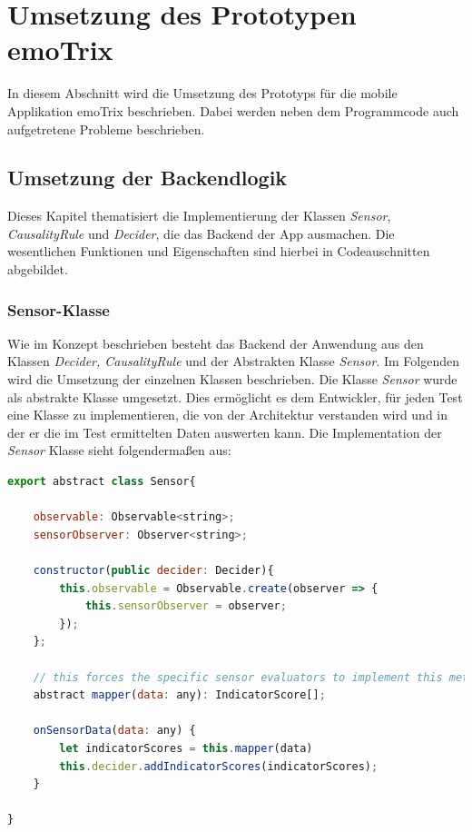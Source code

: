 \section{Umsetzung des Prototypen emoTrix}
In diesem Abschnitt wird die Umsetzung des Prototyps für die mobile Applikation emoTrix beschrieben. Dabei werden neben dem Programmcode auch aufgetretene Probleme beschrieben.
\subsection{Umsetzung der Backendlogik}
Dieses Kapitel thematisiert die Implementierung der Klassen \textit{Sensor}, \textit{CausalityRule} und \textit{Decider}, die das Backend der App ausmachen. Die wesentlichen Funktionen und Eigenschaften sind hierbei in Codeauschnitten abgebildet.
\subsubsection{Sensor-Klasse}
Wie im Konzept beschrieben besteht das Backend der Anwendung aus den Klassen \textit{Decider, CausalityRule} und der Abstrakten Klasse \textit{Sensor}. Im Folgenden wird die Umsetzung der einzelnen Klassen beschrieben.\newline
Die Klasse \textit{Sensor} wurde als abstrakte Klasse umgesetzt. Dies ermöglicht es dem Entwickler, für jeden Test eine Klasse zu implementieren, die von der Architektur verstanden wird und in der er die im Test ermittelten Daten auswerten kann. Die Implementation der \textit{Sensor} Klasse sieht folgendermaßen aus: \newline
\begin{lstlisting}[caption={abstrakte Klasse Sensor},language=JavaScript]
export abstract class Sensor{

	observable: Observable<string>;
	sensorObserver: Observer<string>;

	constructor(public decider: Decider){
		this.observable = Observable.create(observer => {
			this.sensorObserver = observer;
		});
	};

	// this forces the specific sensor evaluators to implement this method
	abstract mapper(data: any): IndicatorScore[]; 

	onSensorData(data: any) {
		let indicatorScores = this.mapper(data)
		this.decider.addIndicatorScores(indicatorScores);
	}

}
\end{lstlisting}
